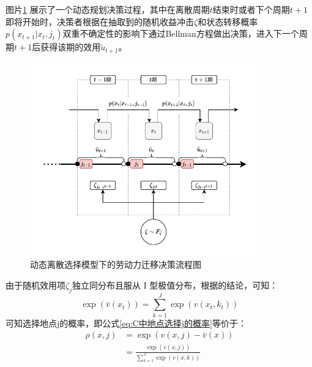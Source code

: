 \documentclass[a4paper,12pt,oneside]{book} %
\begin{document}
图片\ref{fig:migration_flow_resized2} 展示了一个动态规划决策过程，其中在离散周期$t$结束时或者下个周期$t+1$即将开始时，决策者根据在抽取到的随机收益冲击$\zeta$和状态转移概率$p(x_{t+1}|x_t,j_t)$双重不确定性的影响下通过Bellman方程做出决策，进入下一个周期$t+1$后获得该期的效用$\tilde u_{t+1}$。

\begin{figure}[!ht]
\centering
\includegraphics[width=0.9\textwidth]{images/dynamicsequence2.drawio.pdf}
\caption{动态离散选择模型下的劳动力迁移决策流程图}
\label{fig:migration_flow_resized2}
\end{figure}

由于随机效用项$\zeta_j$独立同分布且服从 I 型极值分布，根据\cite{mcfaddenConditionalLogitAnalysis1973,rustOptimalReplacementGMC1987,rustStructuralEstimationMarkov1994}的结论，可知：
\begin{equation}
  \exp(\bar v(x_t))=\sum\limits_{k=1}^{J}\exp(v(x_t,k_t))
\end{equation}
可知选择地点j的概率，即公式\ref{eq:C中地点选择j的概率}等价于：
\begin{align}
\rho(x,j)&=\exp(v(x,j)-\bar v(x))
\\&=\frac{\exp(v(x,j))}{\sum\limits_{k=1}^J \exp(v(x,k))} \label{eq:地点选择概率}
\end{align}



\end{document}
